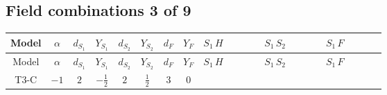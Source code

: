 \documentclass[8pt]{article}
\begin{document}
\begin{landscape}
\subsection*{Field combinations 3 of 9}
\begin{longtable}{@{}cccccccc >{\raggedright\arraybackslash}p{0.21\linewidth} >{\raggedright\arraybackslash}p{0.21\linewidth} >{\raggedright\arraybackslash}p{0.21\linewidth}@{}}
\toprule
Model & $\alpha$ & $d_{S_1}$ & $Y_{S_1}$ & $d_{S_2}$ & $Y_{S_2}$ & $d_F$ & $Y_F$ & $S_1\,H$ & $S_1\,S_2$ & $S_1\,F$ \\
\midrule
\endfirsthead
\toprule
Model & $\alpha$ & $d_{S_1}$ & $Y_{S_1}$ & $d_{S_2}$ & $Y_{S_2}$ & $d_F$ & $Y_F$ & $S_1\,H$ & $S_1\,S_2$ & $S_1\,F$ \\
\midrule
\endhead
T3-C & $-1$ & $2$ & $-\frac{1}{2}$ & $2$ & $\frac{1}{2}$ & $3$ & $0$ & \scriptsize\adjustbox{max width=\linewidth}{$\begin{gathered} -\frac{2 \sqrt{3} \hbar  \overline{y_{2,i_1,r_1}} H_{a_1} H_{a_2} S_{1,j_1} S_{1,j_2} y_{1,i_1,r_1} \lambda_5 \text{Bar}(\text{cg1})_{a_1,j_1,a_2,j_2}}{\epsilon } \\ -\sqrt{3} \hbar  \overline{y_{2,i_1,r_1}} H_{a_1} H_{a_2} S_{1,j_1} S_{1,j_2} y_{1,i_1,r_1} \lambda_5 \text{Bar}(\text{cg1})_{a_1,j_1,a_2,j_2} \\ -\frac{4 \hbar  \overline{y_{1,i_1,r_1}} \overline{Y_{e,i_2,i_3}} H_{a_1} S_{1,j_1} y_{1,i_2,r_1} Y_{e,i_1,i_3} H_{a_1}{}^{\dagger } S_{1,j_1}{}^{\dagger }}{\sqrt{3} \epsilon }\end{gathered}$} & \scriptsize\adjustbox{max width=\linewidth}{$\begin{gathered} +\text{CNewScalar1NewScalar2} \hbar  S_{1,j_1} S_{2,j_2} \text{Bar}(\text{cg3})_{j_1,j_2} \\ -\frac{1}{2} C_{S_2^\dagger S_2} \hbar  \overline{y_{2,i_1,r_1}} S_{1,j_1} S_{2,j_2} y_{1,i_1,r_1} \text{Bar}(\text{cg3})_{j_1,j_2} \\ -\frac{C_{S_2^\dagger S_2} \hbar  \overline{y_{2,i_1,r_1}} S_{1,j_1} S_{2,j_2} y_{1,i_1,r_1} \text{Bar}(\text{cg3})_{j_1,j_2}}{\epsilon }\end{gathered}$} & \scriptsize\adjustbox{max width=\linewidth}{$\begin{gathered} +\sqrt{3} C_{S_1^\dagger S_1} \hbar  \log \left(\frac{\bar{\mu}^{2}}{M_F^2}\right) \overline{y_{1,i_1,r_1}} S_{1,j_1} y_{1,i_1,r_1} S_{1,j_1}{}^{\dagger } \\ -\frac{5}{3} \hbar  \log \left(\frac{\bar{\mu}^{2}}{M_F^2}\right) \overline{y_{1,i_1,r_1}} \overline{y_{1,i_2,r_2}} S_{1,j_1} S_{1,j_2} y_{1,i_1,r_2} y_{1,i_2,r_1} S_{1,j_1}{}^{\dagger } S_{1,j_2}{}^{\dagger } \\ -\sqrt{3} \hbar  \log \left(\frac{\bar{\mu}^{2}}{M_F^2}\right) \overline{y_{1,i_1,r_1}} S_{1,j_3} S_{1,j_4} y_{1,i_1,r_1} S_{1,j_1}{}^{\dagger } S_{1,j_2}{}^{\dagger } \mathcal{I}_{S_1,j_1,j_3,j_2,j_4}{}^1 \lambda_{S_1}^{(1)}^{(1)}\end{gathered}$} \\

\end{longtable}
\end{landscape}
\end{document}
